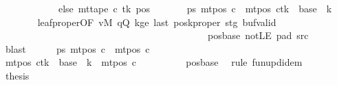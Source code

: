 \begin{isabellebody}
\ \ \ \ \ \ \ \ \ \ \ \ else\ mt{\isacharunderscore}{\kern0pt}tape\ c{\isacharprime}{\kern0pt}\ tk\ pos{\isacharparenright}{\kern0pt}{\isacharparenright}{\kern0pt}{\isachardoublequoteclose}\isanewline
\ \ \ \ \ \ \ ps{\isacharcolon}{\kern0pt}\ {\isachardoublequoteopen}mt{\isacharunderscore}{\kern0pt}pos\ c{\isacharprime}{\kern0pt}{\isacharprime}{\kern0pt}\ {\isacharequal}{\kern0pt}\ {\isacharparenleft}{\kern0pt}mt{\isacharunderscore}{\kern0pt}pos\ c{\isacharprime}{\kern0pt}{\isacharparenright}{\kern0pt}{\isacharparenleft}{\kern0pt}tk\ {\isacharcolon}{\kern0pt}{\isacharequal}{\kern0pt}\ {\isacharquery}{\kern0pt}base\ {\isacharplus}{\kern0pt}\ {\isacharquery}{\kern0pt}k{\isacharparenright}{\kern0pt}{\isachardoublequoteclose}\isanewline
\ \ \ \ \ \ \isamarkupfalse%
\ leaf{\isacharunderscore}{\kern0pt}proper{\isacharbrackleft}{\kern0pt}OF\ vM\ qQ\ kge{}\ last\ poskproper\ stg\ buf{\isacharunderscore}{\kern0pt}valid\isanewline
\ \ \ \ \ \ \ \ \ \ \ \ \ \ \ \ \ \ \ \ \ \ \ \ \ \ \ \ \ \ \ \ \ \ \ \ \ \ \ \ \ \ \ pos{\isacharunderscore}{\kern0pt}base\ notLE\ pad{}\ src{}{\isacharbrackright}{\kern0pt}\isanewline
\ \ \ \ \ \ \isamarkupfalse%
\ blast\isanewline
\ \ \ \ \isamarkupfalse%
\ ps{\isacharprime}{\kern0pt}{\isacharcolon}{\kern0pt}\ {\isachardoublequoteopen}mt{\isacharunderscore}{\kern0pt}pos\ c{\isacharprime}{\kern0pt}{\isacharprime}{\kern0pt}\ {\isacharequal}{\kern0pt}\ mt{\isacharunderscore}{\kern0pt}pos\ c{\isacharprime}{\kern0pt}{\isachardoublequoteclose}\isanewline
\ \ \ \ \isamarkupfalse%
\ {\isacharminus}{\kern0pt}\isanewline
\ \ \ \ \ \ \isamarkupfalse%
\ {\isachardoublequoteopen}{\isacharparenleft}{\kern0pt}mt{\isacharunderscore}{\kern0pt}pos\ c{\isacharprime}{\kern0pt}{\isacharparenright}{\kern0pt}{\isacharparenleft}{\kern0pt}tk\ {\isacharcolon}{\kern0pt}{\isacharequal}{\kern0pt}\ {\isacharquery}{\kern0pt}base\ {\isacharplus}{\kern0pt}\ {\isacharquery}{\kern0pt}k{\isacharparenright}{\kern0pt}\ {\isacharequal}{\kern0pt}\ mt{\isacharunderscore}{\kern0pt}pos\ c{\isacharprime}{\kern0pt}{\isachardoublequoteclose}\isanewline
\ \ \ \ \ \ \ \ \isamarkupfalse%
\ pos{\isacharunderscore}{\kern0pt}base\ \isamarkupfalse%
\ {\isacharparenleft}{\kern0pt}rule\ fun{\isacharunderscore}{\kern0pt}upd{\isacharunderscore}{\kern0pt}idem{\isacharparenright}{\kern0pt}\isanewline
\ \ \ \ \ \ \isamarkupfalse%
\ {\isacharquery}{\kern0pt}thesis\ \isamarkupfalse%

\end{isabellebody}
